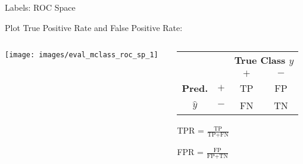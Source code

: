 \documentclass[11pt,compress,t,notes=noshow, xcolor=table]{beamer}
\newenvironment{knitrout}{}{} %
\begin{document}
\begin{vbframe}{Labels: ROC Space}


Plot True Positive Rate and False Positive Rate:
\begin{columns}
\begin{column}{0.5\textwidth}

\begin{knitrout}\scriptsize
{}\color{fgcolor}

{\centering \texttt{[image: images/eval\_mclass\_roc\_sp\_1]} 

}



\end{knitrout}

\end{column}
\begin{column}{0.5\textwidth} 

\begin{center}
\small
\begin{tabular}{cc|cc}
    & & \multicolumn{2}{c}{\bfseries True Class $y$} \\
    & & $+$ & $-$ \\
    \hline
    \bfseries Pred.     & $+$ & TP & FP \\
              $\hat{y}$ & $-$ & FN & TN \\
\end{tabular}

\lz\lz

TPR = $\frac{\text{TP}}{\text{TP} + \text{FN}}$

\lz

FPR = $\frac{\text{FP}}{\text{FP} + \text{TN}}$
\end{center}


\end{column}
\end{columns}

\end{vbframe}
\end{document}
